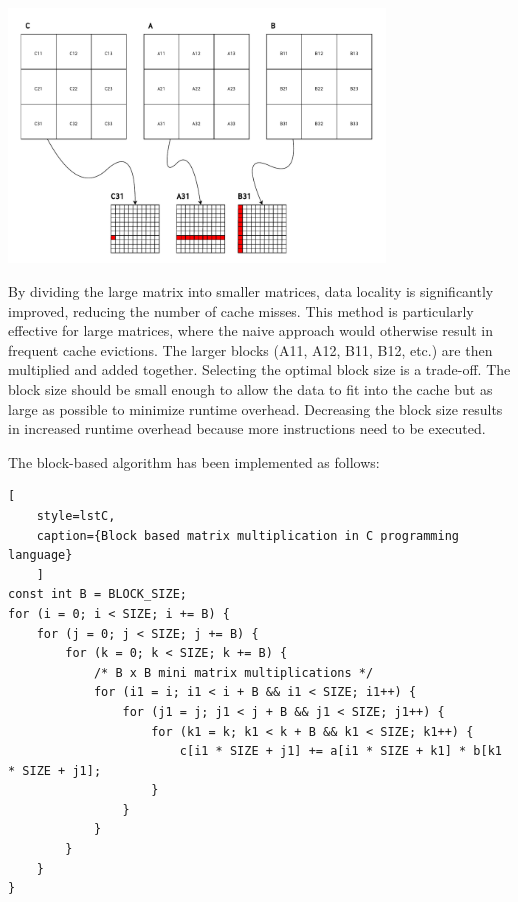 \begin{center}
	\centering
	\includegraphics[width=0.75\textwidth]{figures/05-analysis/mm_block.pdf}
	\label{fig:mm_block}
\end{center}

\noindent By dividing the large matrix into smaller matrices, data locality is significantly improved, reducing the number of cache misses. This method is particularly effective for
large matrices, where the naive approach would otherwise result in frequent cache evictions. The larger blocks (A11, A12, B11, B12, etc.) are then multiplied and added together.
Selecting the optimal block size is a trade-off. The block size should be small enough to allow the data to fit into the cache but as large as possible to minimize runtime
overhead. Decreasing the block size results in increased runtime overhead because more instructions need to be executed.

\noindent The block-based algorithm has been implemented as follows:
\begin{center}
\centering
\begin{minipage}{\linewidth}
\begin{lstlisting}[
	style=lstC,
    caption={Block based matrix multiplication in C programming language}
    ]
const int B = BLOCK_SIZE;
for (i = 0; i < SIZE; i += B) {
	for (j = 0; j < SIZE; j += B) {
		for (k = 0; k < SIZE; k += B) {
			/* B x B mini matrix multiplications */
			for (i1 = i; i1 < i + B && i1 < SIZE; i1++) {
				for (j1 = j; j1 < j + B && j1 < SIZE; j1++) {
					for (k1 = k; k1 < k + B && k1 < SIZE; k1++) {
						c[i1 * SIZE + j1] += a[i1 * SIZE + k1] * b[k1 * SIZE + j1];
					}
				}
			}
		}
	}
}
\end{lstlisting}
\end{minipage}
\end{center}

